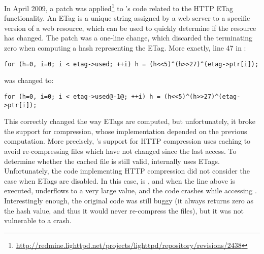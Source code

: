 In April 2009, a patch was
applied\footnote{\url{http://redmine.lighttpd.net/projects/lighttpd/repository/revisions/2438}}
to \lighttpd's code related to the HTTP ETag functionality.  An ETag
is a unique string assigned by a web server to a specific version of a
web resource, which can be used to quickly determine if the resource
has changed.  The patch was a one-line change, which discarded the
terminating zero when computing a hash representing the ETag.  More
exactly, line 47 in :

\begin{lstlisting}[numbers=none,breaklines=true,xleftmargin=0pt]
for (h=0, i=0; i < etag->used; ++i) h = (h<<5)^(h>>27)^(etag->ptr[i]);
\end{lstlisting}
\noindent was changed to:
\begin{lstlisting}[numbers=none,breaklines=true,xleftmargin=0pt]
for (h=0, i=0; i < etag->used@-1@; ++i) h = (h<<5)^(h>>27)^(etag->ptr[i]);
\end{lstlisting}

This correctly changed the way ETags are computed, but unfortunately,
it broke the support for compression, whose implementation depended on
the previous computation.  More precisely, \lighttpd's support for HTTP
compression uses caching to avoid re-compressing files which have not
changed since the last access.  To determine whether the cached
file is still valid, \lighttpd internally uses ETags.  Unfortunately,
the code implementing HTTP compression did not consider the case when
ETags are disabled.  In this case, 
is , and when the line above is
executed,  underflows to a very large value, and
the code crashes while accessing .
Interestingly enough, the original code was still buggy (it always
returns zero as the hash value, and thus it would never re-compress
the files), but it was not vulnerable to a crash. %


